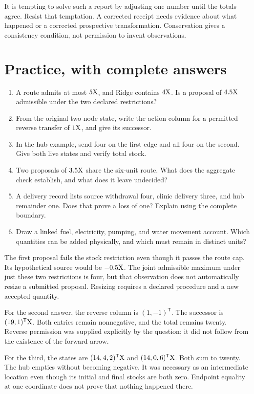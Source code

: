 It is tempting to solve such a report by adjusting one number until the totals agree. Resist that temptation. A corrected receipt needs evidence about what happened or a corrected prospective transformation. Conservation gives a consistency condition, not permission to invent observations.

\section{Practice, with complete answers}

\begin{enumerate}
\item A route admits at most \(5\mathrm{X}\), and Ridge contains \(4\mathrm{X}\). Is a proposal of \(4.5\mathrm{X}\) admissible under the two declared restrictions?
\item From the original two-node state, write the action column for a permitted reverse transfer of \(1\mathrm{X}\), and give its successor.
\item In the hub example, send four on the first edge and all four on the second. Give both live states and verify total stock.
\item Two proposals of \(3.5\mathrm{X}\) share the six-unit route. What does the aggregate check establish, and what does it leave undecided?
\item A delivery record lists source withdrawal four, clinic delivery three, and hub remainder one. Does that prove a loss of one? Explain using the complete boundary.
\item Draw a linked fuel, electricity, pumping, and water movement account. Which quantities can be added physically, and which must remain in distinct units?
\end{enumerate}

The first proposal fails the stock restriction even though it passes the route cap. Its hypothetical source would be \(-0.5\mathrm{X}\). The joint admissible maximum under just these two restrictions is four, but that observation does not automatically resize a submitted proposal. Resizing requires a declared procedure and a new accepted quantity.

For the second answer, the reverse column is \((1,-1)^{\mathsf T}\). The successor is \((19,1)^{\mathsf T}\mathrm{X}\). Both entries remain nonnegative, and the total remains twenty. Reverse permission was supplied explicitly by the question; it did not follow from the existence of the forward arrow.

For the third, the states are \((14,4,2)^{\mathsf T}\mathrm{X}\) and \((14,0,6)^{\mathsf T}\mathrm{X}\). Both sum to twenty. The hub empties without becoming negative. It was necessary as an intermediate location even though its initial and final stocks are both zero. Endpoint equality at one coordinate does not prove that nothing happened there.

